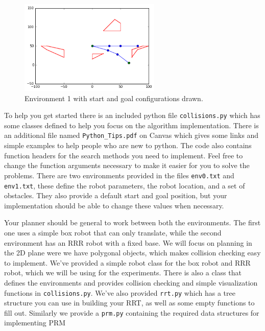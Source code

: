 \documentclass[11pt]{kuntz-hw}
\begin{document}
\begin{figure}[h]
  \centering
  \includegraphics[width=0.6\textwidth]{env1}
  \caption{Environment 1 with start and goal configurations drawn.}
\end{figure}

To help you get started there is an included python file \texttt{collisions.py} which has some classes defined to help you focus on the algorithm implementation. There is an additional file named \texttt{Python\_Tips.pdf} on Canvas which gives some links and simple examples to help people who are new to python. The code also contains function headers for the search methods you need to implement. Feel free to change the function arguments necessary to make it easier for you to solve the problems. There are two environments provided in the files \texttt{env0.txt} and \texttt{env1.txt}, these define the robot parameters, the robot location, and a set of obstacles. They also provide a default start and goal position, but your implementation should be able to change these values when necessary.

Your planner should be general to work between both the environments. The first one uses a simple box robot that can only translate, while the second environment has an RRR robot with a fixed base. We will focus on planning in the 2D plane were we have polygonal objects, which makes collision checking easy to implement. We've provided a simple robot class for the box robot and RRR robot, which we will be using for the experiments. There is also a class that defines the environments and provides collision checking and simple visualization functions in \texttt{collisions.py}. We've also provided \texttt{rrt.py} which has a tree structure you can use in building your RRT, as well as some empty functions to fill out. Similarly we provide a \texttt{prm.py} containing the required data structures for implementing PRM
\end{document}
